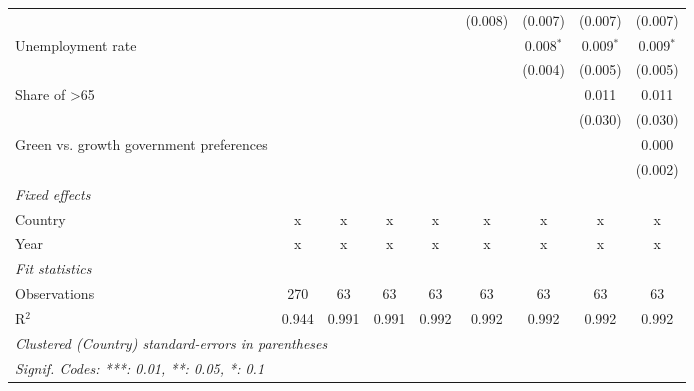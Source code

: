 \begin{table}[htbp]
\begin{tabular}{lcccccccc}
                                                                            &         &         &         &             & (0.008)     & (0.007)     & (0.007)     & (0.007)\\   
      Unemployment rate                                                     &         &         &         &             &             & 0.008$^{*}$ & 0.009$^{*}$ & 0.009$^{*}$\\   
                                                                            &         &         &         &             &             & (0.004)     & (0.005)     & (0.005)\\   
      Share of >65                                                          &         &         &         &             &             &             & 0.011       & 0.011\\   
                                                                            &         &         &         &             &             &             & (0.030)     & (0.030)\\   
      Green vs. growth government preferences                               &         &         &         &             &             &             &             & 0.000\\   
                                                                            &         &         &         &             &             &             &             & (0.002)\\   
      \emph{Fixed effects}\\
      Country                                                               & x       & x       & x       & x           & x           & x           & x           & x\\  
      Year                                                                  & x       & x       & x       & x           & x           & x           & x           & x\\  
      \midrule \emph{Fit statistics}\\
      Observations                                                          & 270     & 63      & 63      & 63          & 63          & 63          & 63          & 63\\  
      R$^2$                                                                 & 0.944   & 0.991   & 0.991   & 0.992       & 0.992       & 0.992       & 0.992       & 0.992\\  
      \midrule
      \multicolumn{9}{l}{\emph{Clustered (Country) standard-errors in parentheses}}\\
      \multicolumn{9}{l}{\emph{Signif. Codes: ***: 0.01, **: 0.05, *: 0.1}}\\
   \end{tabular}
\end{table}


